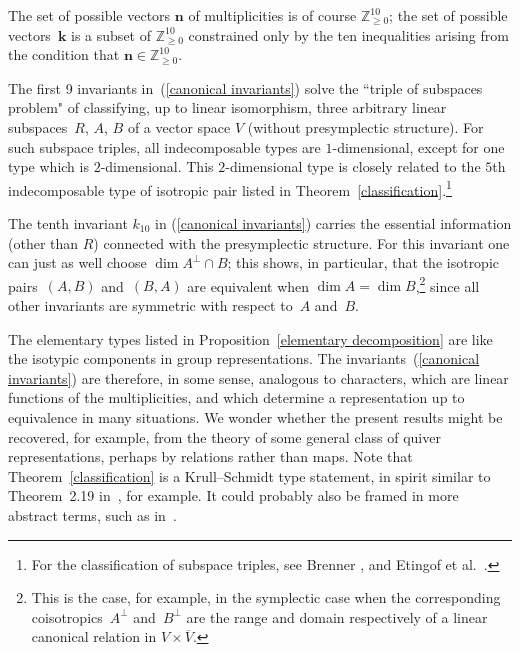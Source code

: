 \documentclass[pdftex]{sigma}
\numberwithin{equation}{section}
\begin{document}
\begin{Remark}
The set of possible vectors $\textbf{n}$ of multiplicities is  of course $\mathbb{Z}_{\geq 0}^{10}$; the set of possible vectors~$\textbf{k}$ is a subset of $\mathbb{Z}_{\geq 0}^{10}$ constrained only by the ten inequalities arising from the condition that $\textbf{n} \in \mathbb{Z}_{\geq 0}^{10}$.
\end{Remark}

\begin{Remark}
The f\/irst 9 invariants in~(\ref{canonical invariants}) solve the ``triple of subspaces problem" of classifying, up to linear isomorphism, three arbitrary linear subspaces~$R$, $A$, $B$ of a vector space $V$ (without presymplectic structure). For such subspace triples, all indecomposable types are $1$-dimensional, except for one type which is $2$-dimensional. This $2$-dimensional type is closely related to the $5$th indecomposable type of isotropic pair listed in Theorem~\ref{classification}.\footnote{For the classif\/ication of subspace triples, see Brenner \cite[pp.~109--110]{Brenner_Three_Subspaces}, and Etingof et al.~\cite[pp.~84--86]{Etingof}.}

The tenth invariant $k_{10}$ in (\ref{canonical invariants}) carries the essential information  (other than $R$) connected with the presymplectic structure. For this invariant one can just as well choose $\dim A^{\perp} \cap B$; this shows, in particular, that the isotropic pairs~$(A,B)$ and~$(B,A)$ are equivalent when $\dim A = \dim B$,\footnote{This is the case, for example, in the symplectic case when the corresponding coisotropics~$A^\perp$ and~$B^\perp$ are the range and domain respectively of a linear canonical relation in $V \times \overline V.$} since all other invariants are symmetric with respect to~$A$ and~$B$.
\end{Remark}

\begin{Remark}\label{rep theory}
The elementary types listed in Proposition~\ref{elementary decomposition} are like the isotypic components in group representations.   The invariants~(\ref{canonical invariants}) are therefore, in some sense, analogous to characters, which are linear functions of the multiplicities, and which determine a representation up to equivalence in many situations. We wonder whether the present results might be recovered, for example, from the theory of some general class of quiver representations, perhaps by relations rather than maps. Note that Theorem~\ref{classification} is a Krull--Schmidt type statement, in spirit similar to Theorem~2.19 in~\cite{Etingof}, for example. It could probably also be framed in more abstract terms, such as in~\cite{Atiyah}.
\end{Remark}
\end{document}
